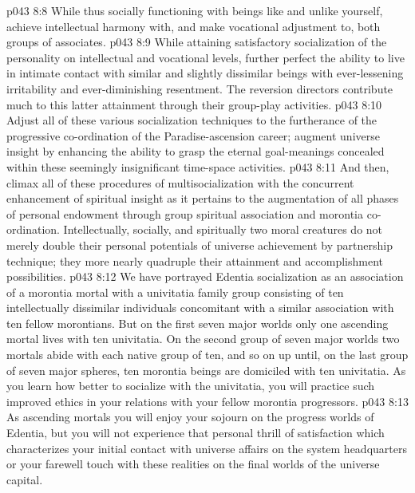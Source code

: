 \pc \vs p043 8:8 \bibnobreakspace While thus socially functioning with beings like and unlike yourself, achieve intellectual harmony with, and make vocational adjustment to, both groups of associates.
\pc \vs p043 8:9 \bibnobreakspace While attaining satisfactory socialization of the personality on intellectual and vocational levels, further perfect the ability to live in intimate contact with similar and slightly dissimilar beings with ever\hyp{}lessening irritability and ever\hyp{}diminishing resentment. The reversion directors contribute much to this latter attainment through their group\hyp{}play activities.
\pc \vs p043 8:10 \bibnobreakspace Adjust all of these various socialization techniques to the furtherance of the progressive co\hyp{}ordination of the Paradise\hyp{}ascension career; augment universe insight by enhancing the ability to grasp the eternal goal\hyp{}meanings concealed within these seemingly insignificant time\hyp{}space activities.
\pc \vs p043 8:11 \bibnobreakspace And then, climax all of these procedures of multisocialization with the concurrent enhancement of spiritual insight as it pertains to the augmentation of all phases of personal endowment through group spiritual association and morontia co\hyp{}ordination. Intellectually, socially, and spiritually two moral creatures do not merely double their personal potentials of universe achievement by partnership technique; they more nearly quadruple their attainment and accomplishment possibilities.
\pc \vs p043 8:12 We have portrayed Edentia socialization as an association of a morontia mortal with a univitatia family group consisting of ten intellectually dissimilar individuals concomitant with a similar association with ten fellow morontians. But on the first seven major worlds only one ascending mortal lives with ten univitatia. On the second group of seven major worlds two mortals abide with each native group of ten, and so on up until, on the last group of seven major spheres, ten morontia beings are domiciled with ten univitatia. As you learn how better to socialize with the univitatia, you will practice such improved ethics in your relations with your fellow morontia progressors.
\vs p043 8:13 As ascending mortals you will enjoy your sojourn on the progress worlds of Edentia, but you will not experience that personal thrill of satisfaction which characterizes your initial contact with universe affairs on the system headquarters or your farewell touch with these realities on the final worlds of the universe capital.
